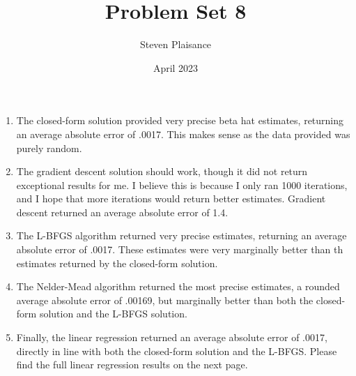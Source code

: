 \documentclass{article}
\title{Problem Set 8}
\author{Steven Plaisance}
\date{April 2023}
\begin{document}
\maketitle

\begin{enumerate}
  \item The closed-form solution provided very precise beta hat estimates, returning an average absolute error of .0017. This makes sense as the data provided was purely random.
  \item The gradient descent solution should work, though it did not return exceptional results for me. I believe this is because I only ran 1000 iterations, and I hope that more iterations would return better estimates. Gradient descent returned an average absolute error of 1.4.
  \item The L-BFGS algorithm returned very precise estimates, returning an average absolute error of .0017. These estimates were very marginally better than th estimates returned by the closed-form solution.
  \item The Nelder-Mead algorithm returned the most precise estimates, a rounded average absolute error of .00169, but marginally better than both the closed-form solution and the L-BFGS solution. 
  \item Finally, the linear regression returned an average absolute error of .0017, directly in line with both the closed-form solution and the L-BFGS. Please find the full linear regression results on the next page.
      \linebreak
    \linebreak
      \parbox{\linewidth}{
}
\end{enumerate}
\end{document}
